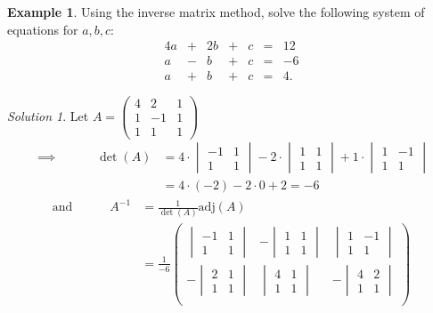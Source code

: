 \documentclass[
  12pt,
  oneside]{book}
\theoremstyle{definition}
\theoremstyle{definition}
\newtheorem{example}{Example}[chapter]
\theoremstyle{definition}
\theoremstyle{definition}
\theoremstyle{remark}
\newtheorem*{solution}{Solution}
\begin{document}
\begin{example}
Using the inverse matrix method, solve the following system of equations for \(a,b,c\):
\[
\begin{matrix}
    4a&+&2b&+&c&=&12\\
     a&-& b&+&c&=&-6\\
     a&+& b&+&c&=&4.
\end{matrix}
\]
\end{example}

\begin{solution}
Let \(A=\begin{pmatrix}4&2&1\\1&-1&1\\1&1&1\end{pmatrix}\)
\begin{align*}
\implies\quad\quad\quad \det(A) &= 4\cdot\begin{vmatrix}-1&1\\1&1\end{vmatrix} -2\cdot\begin{vmatrix}1&1\\1&1\end{vmatrix} +1\cdot\begin{vmatrix}1&-1\\1&1\end{vmatrix}\\
&= 4\cdot(-2)-2\cdot0+2=-6
\end{align*}
\begin{align*}
\text{and}\quad\quad\quad A^{-1}
&= \frac{1}{\det(A)}\mathrm{adj}(A) \\
&= \frac{1}{-6}
\begin{pmatrix}
\begin{vmatrix}-1&1\\1&1\end{vmatrix}&-\begin{vmatrix}1&1\\1&1\end{vmatrix}&\begin{vmatrix}1&-1\\1&1\end{vmatrix}\\
-\begin{vmatrix}2&1\\1&1\end{vmatrix}&\begin{vmatrix}4&1\\1&1\end{vmatrix}&-\begin{vmatrix}4&2\\1&1\end{vmatrix}\\

\end{pmatrix}
\end{align*}
\end{solution}
\end{document}
